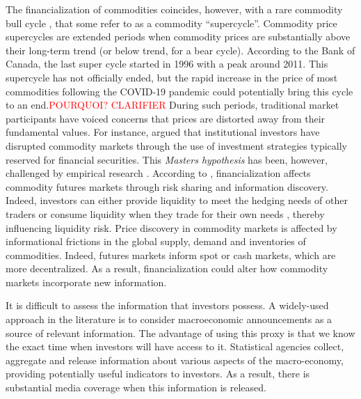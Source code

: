 \documentclass[12pt]{article}
\begin{document}
The financialization of commodities coincides, however, with a rare commodity bull cycle \cite{humphreys2010great}, that some refer to as a commodity ``supercycle''. Commodity price supercycles are extended periods when commodity prices are substantially above their long-term trend (or below trend, for a bear cycle). According to the Bank of Canada, the last super cycle started in 1996 with a peak around 2011. This supercycle has not officially ended, but the rapid increase in the price of most commodities following the COVID-19 pandemic could potentially bring this cycle to an end.\textcolor{red}{POURQUOI? CLARIFIER } During such periods, traditional market participants have voiced concerns that prices are distorted  away from their fundamental values. For instance, \citet{masters2009testimony} argued  that institutional investors have disrupted commodity markets through the use of investment strategies typically reserved for financial securities. This \emph{Masters hypothesis} has been, however, challenged by empirical research \citep{irwin2011index,irwin2012testing,irwin2012financialization}. According to \citet{cheng2014financialization}, financialization affects commodity futures markets through risk sharing and information discovery. Indeed, investors can either provide liquidity to meet the hedging needs of other traders or consume liquidity when they trade for their own needs \citep{kang2020tale} , thereby influencing liquidity risk. Price discovery in commodity markets is affected by informational frictions in the global supply, demand and inventories of commodities. Indeed, futures markets inform spot or cash markets, which are more decentralized. As a result, financialization could alter how commodity markets incorporate new information.

It is difficult to assess the information that investors possess. A widely-used approach in the literature is to consider macroeconomic announcements as a source of relevant information. The advantage of using this proxy is that we know the exact time when investors will have access to it. Statistical agencies collect, aggregate and release information about various aspects of the macro-economy, providing potentially useful indicators to investors. As a result, there is substantial media coverage when this information is released.
\end{document}
